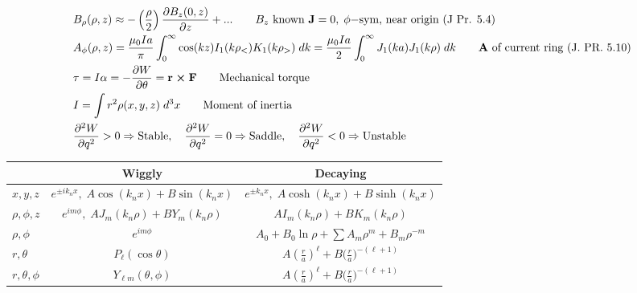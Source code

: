 \documentclass[10pt]{article}
\newcommand{\ve}[1]{\boldsymbol{\mathbf{#1}}}
\newcommand{\vect}[1]{\boldsymbol{\mathbf{#1}}}
\newcommand{\pder}[2]{\frac{\partial #1}{\partial #2}}
\newcommand{\dpder}[2]{\frac{\partial^2 #1}{\partial #2^2}}
\begin{document}
\begin{multicols}{2}
\begin{align*}
		& B_\rho (\rho, z) \approx - \left( \frac{\rho}{2} \right) \pder{B_z(0,z)}{z} + ... \tag*{$B_z$ known $\ve{J} = 0, \; \phi-$sym, near origin (J Pr. 5.4)} \\
		& A_\phi(\rho,z) = \frac{\mu_0 I a}{\pi} \int_0^\infty \cos(kz) I_1 (k \rho_<) K_1(k \rho_>) \; dk = \frac{\mu_0 I a}{2} \int_0^\infty J_1 (ka) J_1 (k \rho) \; dk \tag*{$\ve{A}$ of current ring (J. PR. 5.10)} \\
		& \tau = I \alpha = - \pder{W}{\theta} = \vect{r \times F} \tag*{Mechanical torque}\\
		& I = \int r^2 \rho(x,y,z) \; d^3 x \tag*{Moment of inertia} \\ 
		& \dpder{W}{q} > 0 \Rightarrow \text{Stable}, \quad \dpder{W}{q} = 0 \Rightarrow \text{Saddle}, \quad \dpder{W}{q} < 0 \Rightarrow \text{Unstable} \\
 	\end{align*}
	\renewcommand{\arraystretch}{2}
	\begin{tabular}{| l | c | c |} \hline
		& Wiggly & Decaying \\ \hline
		$x,y,z$ &$ e^{\pm i k_n x}, \; A \cos(k_n x) + B\sin(k_n x)$ & $e^{\pm k_n x}, \; A \cosh( k_n x) + B \sinh(k_n x)$ \\ \hline
		$\rho,\phi,z$ & $e^{i m \phi}, \; A J_m(k_n \rho) + B Y_m(k_n \rho)$ & $ A I_m(k_n \rho) + B K_m(k_n \rho)$ \\ \hline
		$\rho,\phi$ & $e^{i m \phi}$ & $A_0 + B_0 \ln \rho + \sum A_m \rho^m + B_m \rho^{-m}$ \\ \hline
		$r,\theta$ & $P_\ell(\cos \theta)$ & $A \left( \frac{r}{a} \right)^\ell + B \big( \frac{r}{a} \big)^{-(\ell+1)} $ \\ \hline
		$r, \theta, \phi$ & $Y_{\ell m}(\theta, \phi)$ &  $A \left( \frac{r}{a} \right)^\ell + B \big( \frac{r}{a} \big)^{-(\ell+1)} $ \\ \hline
	\end{tabular}
\end{multicols}
 
\end{document}
